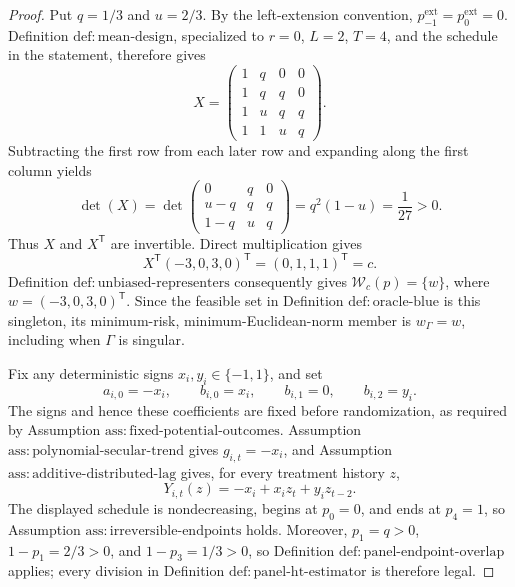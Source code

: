 \documentclass{article}
\begin{document}
\begin{proof}
Put \(q=1/3\) and \(u=2/3\).  By the left-extension convention, \(p^{\mathrm{ext}}_{-1}=p^{\mathrm{ext}}_0=0\).  Definition \(\mathrm{def:mean\text{-}design}\), specialized to \(r=0\), \(L=2\), \(T=4\), and the schedule in the statement, therefore gives
\[
X=
\begin{pmatrix}
1&q&0&0\\
1&q&q&0\\
1&u&q&q\\
1&1&u&q
\end{pmatrix}.
\]
Subtracting the first row from each later row and expanding along the first column yields
\[
\det(X)
=\det\!\begin{pmatrix}
0&q&0\\
u-q&q&q\\
1-q&u&q
\end{pmatrix}
=q^2(1-u)=\frac1{27}>0.
\]
Thus \(X\) and \(X^{\mathsf T}\) are invertible.  Direct multiplication gives
\[
X^{\mathsf T}(-3,0,3,0)^{\mathsf T}
=(0,1,1,1)^{\mathsf T}=c.
\]
Definition \(\mathrm{def:unbiased\text{-}representers}\) consequently gives \(\mathcal W_c(p)=\{w\}\), where \(w=(-3,0,3,0)^{\mathsf T}\).  Since the feasible set in Definition \(\mathrm{def:oracle\text{-}blue}\) is this singleton, its minimum-risk, minimum-Euclidean-norm member is \(w_\Gamma=w\), including when \(\Gamma\) is singular.

Fix any deterministic signs \(x_i,y_i\in\{-1,1\}\), and set
\[
a_{i,0}=-x_i,\qquad b_{i,0}=x_i,\qquad b_{i,1}=0,
\qquad b_{i,2}=y_i.
\tag{1}
\]
The signs and hence these coefficients are fixed before randomization, as required by Assumption \(\mathrm{ass:fixed\text{-}potential\text{-}outcomes}\).  Assumption \(\mathrm{ass:polynomial\text{-}secular\text{-}trend}\) gives \(g_{i,t}=-x_i\), and Assumption \(\mathrm{ass:additive\text{-}distributed\text{-}lag}\) gives, for every treatment history \(z\),
\[
Y_{i,t}(z)=-x_i+x_i z_t+y_i z_{t-2}.
\tag{2}
\]
The displayed schedule is nondecreasing, begins at \(p_0=0\), and ends at \(p_4=1\), so Assumption \(\mathrm{ass:irreversible\text{-}endpoints}\) holds.  Moreover, \(p_1=q>0\), \(1-p_1=2/3>0\), and \(1-p_3=1/3>0\), so Definition \(\mathrm{def:panel\text{-}endpoint\text{-}overlap}\) applies; every division in Definition \(\mathrm{def:panel\text{-}ht\text{-}estimator}\) is therefore legal.


\end{proof}
\end{document}
